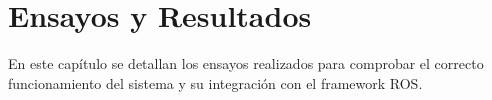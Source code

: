 
\chapter{Ensayos y Resultados}

En este capítulo se detallan los ensayos realizados para comprobar el correcto funcionamiento del sistema y su integración con el framework ROS.

\label{Chapter4}










